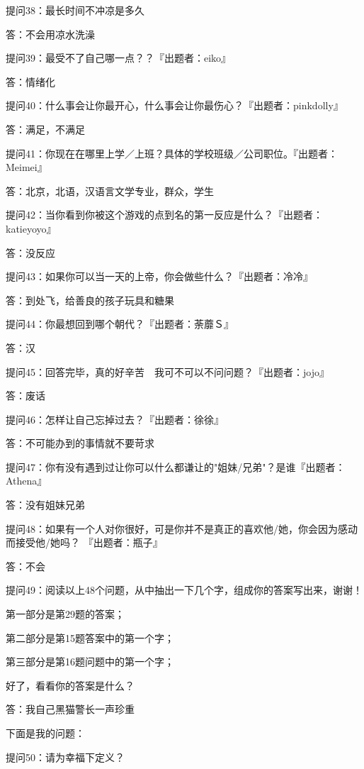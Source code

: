 \documentclass[12pt,a4paper]{article}
\def\blankrev{\vspace{1ex}}									%
\begin{document}
		\blankrev
		提问38：最长时间不冲凉是多久\par
		答：不会用凉水洗澡

		\blankrev
		提问39：最受不了自己哪一点？？『出题者：eiko』\par
		答：情绪化

		\blankrev
		提问40：什么事会让你最开心，什么事会让你最伤心？『出题者：pinkdolly』\par
		答：满足，不满足

		\blankrev
		提问41：你现在在哪里上学／上班？具体的学校班级／公司职位。『出题者：Meimei』\par
		答：北京，北语，汉语言文学专业，群众，学生

		\blankrev
		提问42：当你看到你被这个游戏的点到名的第一反应是什么？『出题者：katieyoyo』\par
		答：没反应

		\blankrev
		提问43：如果你可以当一天的上帝，你会做些什么？『出题者：冷冷』\par
		答：到处飞，给善良的孩子玩具和糖果

		\blankrev
		提问44：你最想回到哪个朝代？『出题者：荼蘼Ｓ』\par
		答：汉

		\blankrev
		提问45：回答完毕，真的好辛苦　我可不可以不问问题？『出题者：jojo』\par
		答：废话

		\blankrev
		提问46：怎样让自己忘掉过去？『出题者：徐徐』\par
		答：不可能办到的事情就不要苛求

		\blankrev
		提问47：你有没有遇到过让你可以什么都谦让的"姐妹/兄弟"？是谁『出题者：Athena』\par
		答：没有姐妹兄弟

		\blankrev
		提问48：如果有一个人对你很好，可是你并不是真正的喜欢他/她，你会因为感动而接受他/她吗？
				『出题者：瓶子』\par
		答：不会

		提问49：阅读以上48个问题，从中抽出一下几个字，组成你的答案写出来，谢谢！\par
		第一部分是第29题的答案；\par
		第二部分是第15题答案中的第一个字；\par
		第三部分是第16题问题中的第一个字；\par
		好了，看看你的答案是什么？\par
		答：我自己黑猫警长一声珍重

		\blankrev \blankrev
		下面是我的问题：\par
		提问50：请为幸福下定义？
\end{document}
